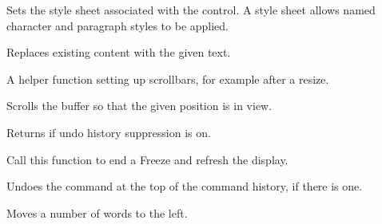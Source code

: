 \label{wxrichtextctrlsetstylesheet}


Sets the style sheet associated with the control. A style sheet allows named
character and paragraph styles to be applied.

\label{wxrichtextctrlsetvalue}


Replaces existing content with the given text.

\label{wxrichtextctrlsetupscrollbars}


A helper function setting up scrollbars, for example after a resize.

\label{wxrichtextctrlshowposition}


Scrolls the buffer so that the given position is in view.

\label{wxrichtextctrlsuppressingundo}


Returns \true if undo history suppression is on.

\label{wxrichtextctrlthaw}


Call this function to end a Freeze and refresh the display.

\label{wxrichtextctrlundo}


Undoes the command at the top of the command history, if there is one.

\label{wxrichtextctrlwordleft}


Moves a number of words to the left.

\label{wxrichtextctrlwordright}

